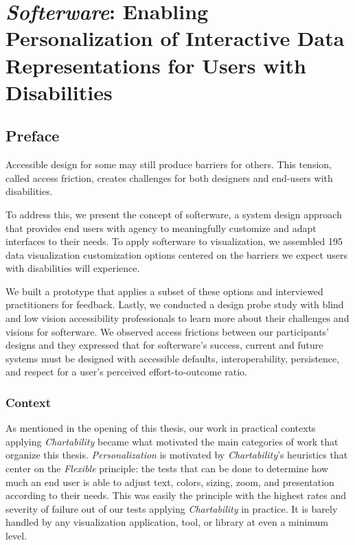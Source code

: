 \documentclass[12pt]{cmuthesis}
\begin{document}
\chapter{\textit{Softerware}: Enabling Personalization of Interactive Data Representations for Users with Disabilities}

\section{Preface}

Accessible design for some may still produce barriers for others. This tension, called access friction, creates challenges for both designers and end-users with disabilities.

To address this, we present the concept of softerware, a system design approach that provides end users with agency to meaningfully customize and adapt interfaces to their needs. To apply softerware to visualization, we assembled 195 data visualization customization options centered on the barriers we expect users with disabilities will experience.

We built a prototype that applies a subset of these options and interviewed practitioners for feedback. Lastly, we conducted a design probe study with blind and low vision accessibility professionals to learn more about their challenges and visions for softerware. We observed access frictions between our participants' designs and they expressed that for softerware's success, current and future systems must be designed with accessible defaults, interoperability, persistence, and respect for a user's perceived effort-to-outcome ratio.

\subsection{Context}

As mentioned in the opening of this thesis, our work in practical contexts applying \textit{Chartability} became what motivated the main categories of work that organize this thesis. \textit{Personalization} is motivated by \textit{Chartability}'s heuristics that center on the \textit{Flexible} principle: the tests that can be done to determine how much an end user is able to adjust text, colors, sizing, zoom, and presentation according to their needs. This was easily the principle with the highest rates and severity of failure out of our tests applying \textit{Chartability} in practice. It is barely handled by any visualization application, tool, or library at even a minimum level.
\end{document}
